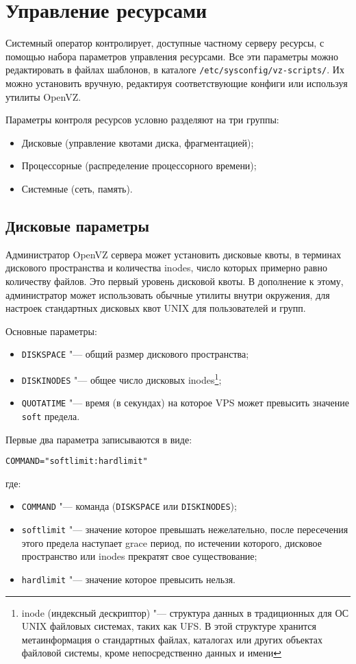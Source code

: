 \section{Управление ресурсами}

Системный оператор контролирует, доступные частному серверу ресурсы, с помощью набора параметров управления ресурсами. 
Все эти параметры можно редактировать в файлах шаблонов, в каталоге \texttt{/etc/sysconfig/vz-scripts/}.
Их можно установить вручную, редактируя соответствующие конфиги или используя утилиты OpenVZ.

Параметры контроля ресурсов условно разделяют на три группы:
\begin{itemize}
    \item Дисковые (управление квотами диска, фрагментацией);
    \item Процессорные (распределение процессорного времени);
    \item Системные (сеть, память).
\end{itemize}

\subsection{Дисковые параметры}
Администратор OpenVZ сервера может установить дисковые квоты, в терминах дискового пространства и количества inodes, число которых примерно равно количеству файлов. 
Это первый уровень дисковой квоты.
В дополнение к этому, администратор может использовать обычные утилиты внутри окружения, для настроек стандартных дисковых квот UNIX для пользователей и групп.

Основные параметры:
\begin{itemize}
    \item \texttt{DISKSPACE} "--- общий размер дискового пространства;
    \item \texttt{DISKINODES} "--- общее число дисковых inodes\footnote{inode (индексный дескриптор) "--- структура данных в традиционных для ОС UNIX файловых системах, таких как UFS. В этой структуре хранится метаинформация о стандартных файлах, каталогах или других объектах файловой системы, кроме непосредственно данных и имени};
    \item \texttt{QUOTATIME} "--- время (в секундах) на которое VPS может превысить значение \texttt{soft} предела.
\end{itemize}

Первые два параметра записываются в виде:
\begin{lstlisting}
COMMAND="softlimit:hardlimit"
\end{lstlisting}
где:
\begin{itemize}
    \item \texttt{COMMAND} "--- команда (\texttt{DISKSPACE} или \texttt{DISKINODES});
    \item \texttt{softlimit} "--- значение которое превышать нежелательно, после пересечения этого предела наступает grace период, по истечении которого, дисковое пространство или inodes прекратят свое существование;
    \item \texttt{hardlimit} "--- значение которое превысить нельзя.
\end{itemize}

